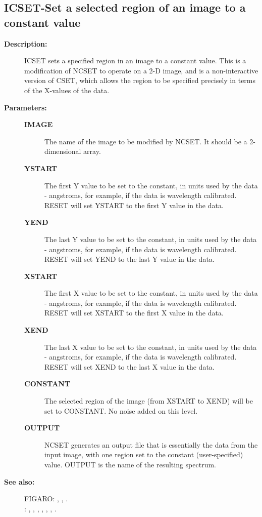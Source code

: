 \subsection{ICSET-\label{ICSET}Set a selected region of an image to a constant value}
\begin{description}

\item [{\bf Description:}]
 ICSET sets a specified region in an image to a constant value.
 This is a modification of NCSET to operate on a 2-D image, and is
 a non-interactive version of CSET, which allows the region
 to be specified precisely in terms of the X-values of the data.

\item [{\bf Parameters:}]
\begin{description}
\item [{\bf IMAGE}]
 The name of the image to be modified by NCSET.
 It should be a 2-dimensional array.
\item [{\bf YSTART}]
 The first Y value to be set to the constant,
 in units used by the data - angstroms, for example, if the
 data is wavelength calibrated.  RESET will set YSTART to the
 first Y value in the data.
\item [{\bf YEND}]
 The last Y value to be set to the constant,
 in units used by the data - angstroms, for example, if the
 data is wavelength calibrated.  RESET will set YEND to the
 last Y value in the data.
\item [{\bf XSTART}]
 The first X value to be set to the constant,
 in units used by the data - angstroms, for example, if the
 data is wavelength calibrated.  RESET will set XSTART to the
 first X value in the data.
\item [{\bf XEND}]
 The last X value to be set to the constant,
 in units used by the data - angstroms, for example, if the
 data is wavelength calibrated.  RESET will set XEND to the
 last X value in the data.
\item [{\bf CONSTANT}]
 The selected region of the image (from XSTART to
 XEND) will be set to CONSTANT. No noise added on this
 level.
\item [{\bf OUTPUT}]
 NCSET generates an output file that is essentially the
 data from the input image, with one region set to the
 constant (user-specified) value.  OUTPUT is the name of
 the resulting spectrum.
\end{description}

\item [{\bf See also:}]
FIGARO: , , .\\
: , , , , , , .\\


\end{description}
